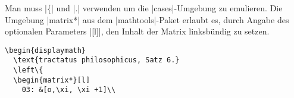 % 

Man muss |\left\{| und |\right.| verwenden um die |cases|-Umgebung zu emulieren. Die Umgebung |matrix*| aus dem |mathtools|-Paket erlaubt es, durch Angabe des optionalen Parameters |[l]|, den Inhalt der Matrix linksbündig zu setzen.                                                                                       
\begin{lstlisting}                                                                                                                                                                                                                                                                                                             
\begin{displaymath}                                                                                                                                                                                                                                                                                                            
  \text{tractatus philosophicus, Satz 6.}                                                                                                                                                                                                                                                                                      
  \left\{                                                                                                                                                                                                                                                                                                                      
  \begin{matrix*}[l]                                                                                                                                                                                                                                                                                                           
    03: &[o,\xi, \xi +1]\\                                                                                                                                                                                                                                                                                      

\end{lstlisting}

